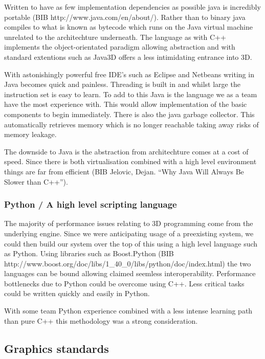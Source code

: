 Written to have as few implementation dependencies as possible java
is incredibly portable (BIB http://www.java.com/en/about/). Rather
than to binary java compiles to what is known as bytecode which runs
on the Java virtual machine unrelated to the architechture underneath.
The language as with C++ implements the object-orientated paradigm
allowing abstraction and with standard extentions such as Java3D offers
a less intimidating entrance into 3D.

With astonishingly powerful free IDE's such as Eclipse and Netbeans
writing in Java becomes quick and painless. Threading is built in
and whilst large the instruction set is easy to learn. To add to this
Java is the language we as a team have the most experience with. This
would allow implementation of the basic components to begin immediately.
There is also the java garbage collector. This automatically retrieves
memory which is no longer reachable taking away risks of memory leakage.

The downside to Java is the abstraction from architechture comes at
a cost of speed. Since there is both virtualisation combined with
a high level environment things are far from efficient (BIB Jelovic,
Dejan. ``Why Java Will Always Be Slower than C++''). 


\subsubsection*{Python / A high level scripting language}

The majority of performance issues relating to 3D programming come
from the underlying engine. Since we were anticipating usage of a
preexisting system, we could then build our system over the top of
this using a high level language such as Python. Using libraries such
as Boost.Python (BIB http://www.boost.org/doc/libs/1\_40\_0/libs/python/doc/index.html)
the two languages can be bound allowing claimed seemless interoperability.
Performance bottlenecks due to Python could be overcome using C++.
Less critical tasks could be written quickly and easily in Python.

With some team Python experience combined with a less intense learning
path than pure C++ this methodology was a strong consideration.


\subsection*{Graphics standards}

